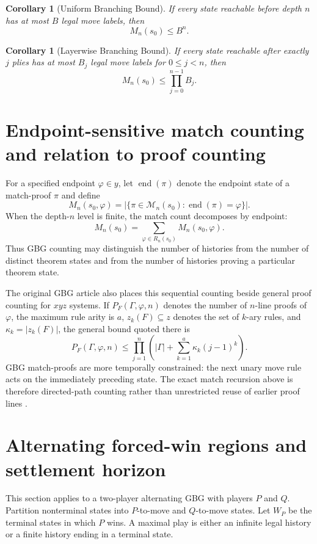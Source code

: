 \documentclass[11pt]{article}
\newtheorem{corollary}[theorem]{Corollary}
\theoremstyle{definition}
\theoremstyle{remark}
\begin{document}
\begin{corollary}[Uniform Branching Bound]
If every state reachable before depth $n$ has at most $B$ legal move labels, then
\[
M_n(s_0)\le B^n.
\]
\end{corollary}

\begin{corollary}[Layerwise Branching Bound]
If every state reachable after exactly $j$ plies has at most $B_j$ legal move labels for $0\le j<n$, then
\[
M_n(s_0)\le\prod_{j=0}^{n-1}B_j.
\]
\end{corollary}

\section{Endpoint-sensitive match counting and relation to proof counting}
For a specified endpoint $\varphi\in y$, let $\operatorname{end}(\pi)$ denote the endpoint state of a match-proof $\pi$ and define
\[
M_n(s_0,\varphi)=
\bigl|\{\pi\in\mathcal M_n(s_0):\operatorname{end}(\pi)=\varphi\}\bigr|.
\]
When the depth-$n$ level is finite, the match count decomposes by endpoint:
\[
\boxed{
M_n(s_0)=\sum_{\varphi\in R_n(s_0)}M_n(s_0,\varphi).
}
\]
Thus GBG counting may distinguish the number of histories from the number of distinct theorem states and from the number of histories proving a particular theorem state.

The original GBG article also places this sequential counting beside general proof counting for $xyz$ systems.  If $P_F(\Gamma,\varphi,n)$ denotes the number of $n$-line proofs of $\varphi$, the maximum rule arity is $a$, $z_k(F)\subseteq z$ denotes the set of $k$-ary rules, and $\kappa_k=|z_k(F)|$, the general bound quoted there is
\[
P_F(\Gamma,\varphi,n)
\le
\prod_{j=1}^{n}
\left(
|\Gamma|+\sum_{k=1}^{a}\kappa_k(j-1)^k
\right).
\]
GBG match-proofs are more temporally constrained: the next unary move rule acts on the immediately preceding state.  The exact match recursion above is therefore directed-path counting rather than unrestricted reuse of earlier proof lines \cite{TennesonGBG,TennesonDepths}.

\section{Alternating forced-win regions and settlement horizon}

This section applies to a two-player alternating GBG with players $P$ and $Q$.  Partition nonterminal states into $P$-to-move and $Q$-to-move states.  Let $W_P$ be the terminal states in which $P$ wins.  A maximal play is either an infinite legal history or a finite history ending in a terminal state.
\end{document}
